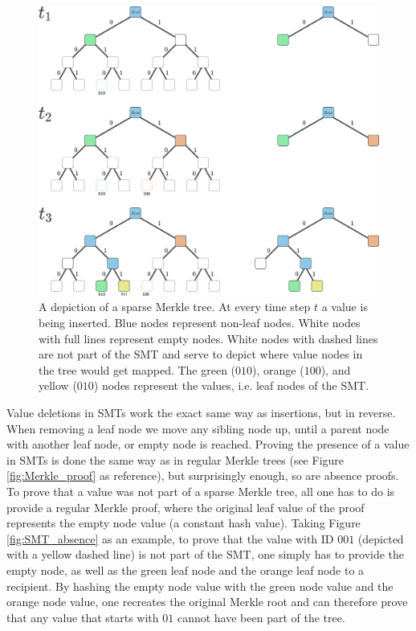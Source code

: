 \documentclass{article}
\begin{document}
\begin{figure}[h]
\centering\includegraphics[width=0.8\linewidth]{figures/smt_insertion.png}
\caption{A depiction of a sparse Merkle tree. At every time step $t$ a value is being inserted. Blue nodes represent non-leaf nodes. White nodes with full lines represent empty nodes. White nodes with dashed lines are not part of the SMT and serve to depict where value nodes in the tree would get mapped. The green ($010$), orange ($100$), and yellow ($010$) nodes represent the values, i.e. leaf nodes of the SMT. }
\label{fig:SMT_insertion}
\end{figure}

Value deletions in SMTs work the exact same way as insertions, but in reverse. When removing a leaf node we move any sibling node up, until a parent node with another leaf node, or empty node is reached. Proving the presence of a value in SMTs is done the same way as in regular Merkle trees (see Figure \ref{fig:Merkle_proof} as reference), but surprisingly enough, so are absence proofs. To prove that a value was not part of a sparse Merkle tree, all one has to do is provide a regular Merkle proof, where the original leaf value of the proof represents the empty node value (a constant hash value). Taking Figure \ref{fig:SMT_absence} as an example, to prove that the value with ID $001$ (depicted with a yellow dashed line) is not part of the SMT, one simply has to provide the empty node, as well as the green leaf node and the orange leaf node to a recipient. By hashing the empty node value with the green node value and the orange node value, one recreates the original Merkle root and can therefore prove that any value that starts with $01$ cannot have been part of the tree.
\end{document}
